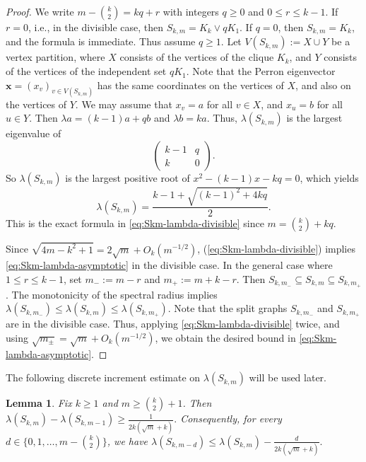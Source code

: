 \documentclass[11pt]{article}
\newtheorem{lemma}[theorem]{Lemma}
\theoremstyle{definition}
\theoremstyle{plain}
\begin{document}
\begin{proof}
We write $m-\binom{k}{2}=kq+r$ with integers \(q\ge0\) and \(0\le r\le k-1\).
If $r=0$, i.e., in the divisible case, then $S_{k,m}=K_k\vee qK_1$.
If \(q=0\), then \(S_{k,m}=K_k\), and the formula is immediate. Thus assume \(q\ge1\).
Let $V(S_{k,m}):=X\cup Y$ be a vertex partition, where $X$ consists of the vertices of the clique $K_k$, and $Y$ consists of the vertices of the independent set $qK_1$.  
Note that the Perron eigenvector $\bm{x} =(x_v)_{v\in V(S_{k,m})}$ has the same coordinates on the vertices of $X$, and also on the vertices of \(Y\). We may assume that $x_v=a$ for all $v\in X$,  and $x_u=b$ for all $u\in Y$. 
Then $\lambda a=(k-1)a+qb$ and $\lambda b=ka$. Thus, $\lambda (S_{k,m})$ is the largest eigenvalue of 
\[
  \begin{pmatrix}
    k-1 & q \\ k & 0 
  \end{pmatrix}.
\]
So $\lambda(S_{k,m})$ is the largest positive root of $x^2-(k-1)x-kq=0$,
which yields  
\[
  \lambda (S_{k,m})
  =
  \frac{k-1 +\sqrt{(k-1)^2 + 4kq}}{2}.
\]
This is the exact formula in \eqref{eq:Skm-lambda-divisible} since $m=\binom{k}{2}+kq$.

Since $\sqrt{4m-k^2+1}=2\sqrt m+O_k(m^{-1/2})$,  (\ref{eq:Skm-lambda-divisible}) implies \eqref{eq:Skm-lambda-asymptotic} in the divisible case.  
In the general case where $1\le r \le k-1$, set $m_-:=m-r$ and $m_+:=m+k-r$. Then $S_{k,m_-}\subseteq S_{k,m}\subseteq S_{k,m_+}$. 
The monotonicity of the spectral radius implies $\lambda(S_{k,m_-})
   \le
  \lambda(S_{k,m})
   \le
  \lambda(S_{k,m_+}).$
Note that the split graphs $S_{k,m_-}$ and $S_{k,m_+}$ are in the divisible case. Thus, applying \eqref{eq:Skm-lambda-divisible} twice, and using $\sqrt{m_\pm}=\sqrt m+O_k(m^{-1/2})$,  
we obtain the desired bound in \eqref{eq:Skm-lambda-asymptotic}.
\end{proof}

The following discrete increment estimate on $\lambda (S_{k,m})$ will be used later.

\begin{lemma} 
\label{lem:Skm-increment}
Fix $k\ge 1$ and $m\ge \binom{k}{2}+1$.
Then
$\lambda(S_{k,m})-\lambda(S_{k,m-1})
   \ge
  \frac{1}{2k(\sqrt m+k)}.$
Consequently, for every $d\in\{0,1,\dots,m-\binom{k}{2}\}$, we have 
$
  \lambda(S_{k,m-d})
   \le
  \lambda(S_{k,m})-\frac{d}{2k(\sqrt m+k)}.$
\end{lemma}
\end{document}
